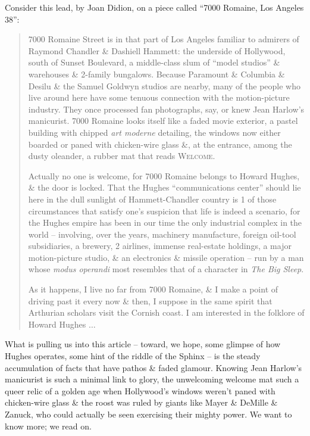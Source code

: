 \documentclass{article}
\begin{document}
Consider this lead, by Joan Didion, on a piece called ``7000 Romaine, Los Angeles 38'':
\begin{quotation}
	7000 Romaine Street is in that part of Los Angeles familiar to admirers of Raymond Chandler \& Dashiell Hammett: the underside of Hollywood, south of Sunset Boulevard, a middle-class slum of ``model studios'' \& warehouses \& 2-family bungalows. Because Paramount \& Columbia \& Desilu \& the Samuel Goldwyn studios are nearby, many of the people who live around here have some tenuous connection with the motion-picture industry. They once processed fan photographs, say, or knew Jean Harlow's manicurist. 7000 Romaine looks itself like a faded movie exterior, a pastel building with chipped \textit{art moderne} detailing, the windows now either boarded or paned with chicken-wire glass \&, at the entrance, among the dusty oleander, a rubber mat that reads \textsc{Welcome}.
	
	Actually no one is welcome, for 7000 Romaine belongs to Howard Hughes, \& the door is locked. That the Hughes ``communications center'' should lie here in the dull sunlight of Hammett-Chandler country is 1 of those circumstances that satisfy one's suspicion that life is indeed a scenario, for the Hughes empire has been in our time the only industrial complex in the world -- involving, over the years, machinery manufacture, foreign oil-tool subsidiaries, a brewery, 2 airlines, immense real-estate holdings, a major motion-picture studio, \& an electronics \& missile operation -- run by a man whose \textit{modus operandi} most resembles that of a character in \textit{The Big Sleep}.
	
	As it happens, I live no far from 7000 Romaine, \& I make a point of driving past it every now \& then, I suppose in the same spirit that Arthurian scholars visit the Cornish coast. I am interested in the folklore of Howard Hughes $\ldots$
\end{quotation}
What is pulling us into this article -- toward, we hope, some glimpse of how Hughes operates, some hint of the riddle of the Sphinx -- is the steady accumulation of facts that have pathos \& faded glamour. Knowing Jean Harlow's manicurist is such a minimal link to glory, the unwelcoming welcome mat such a queer relic of a golden age when Hollywood's windows weren't paned with chicken-wire glass \& the roost was ruled by giants like Mayer \& DeMille \& Zanuck, who could actually be seen exercising their mighty power. We want to know more; we read on.
\end{document}
